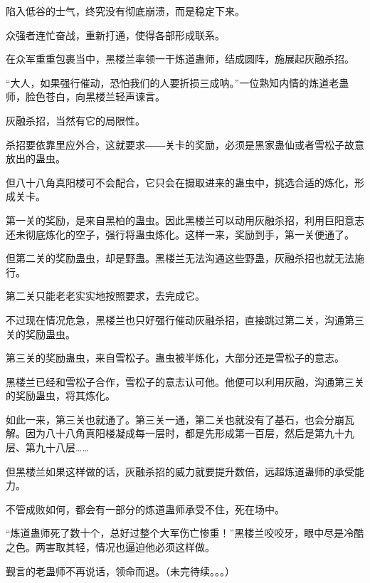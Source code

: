\begin{this_body}
陷入低谷的士气，终究没有彻底崩溃，而是稳定下来。

众强者连忙奋战，重新打通，使得各部形成联系。

在众军重重包裹当中，黑楼兰率领一干炼道蛊师，结成圆阵，施展起灰融杀招。

“大人，如果强行催动，恐怕我们的人要折损三成呐。”一位熟知内情的炼道老蛊师，脸色苍白，向黑楼兰轻声谏言。

灰融杀招，当然有它的局限性。

杀招要依靠里应外合，这就要求――关卡的奖励，必须是黑家蛊仙或者雪松子故意放出的蛊虫。

但八十八角真阳楼可不会配合，它只会在摄取进来的蛊虫中，挑选合适的炼化，形成关卡。

第一关的奖励，是来自黑柏的蛊虫。因此黑楼兰可以动用灰融杀招，利用巨阳意志还未彻底炼化的空子，强行将蛊虫炼化。这样一来，奖励到手，第一关便通了。

但第二关的奖励蛊虫，却是野蛊。黑楼兰无法沟通这些野蛊，灰融杀招也就无法施行。

第二关只能老老实实地按照要求，去完成它。

不过现在情况危急，黑楼兰也只好强行催动灰融杀招，直接跳过第二关，沟通第三关的奖励蛊虫。

第三关的奖励蛊虫，来自雪松子。蛊虫被半炼化，大部分还是雪松子的意志。

黑楼兰已经和雪松子合作，雪松子的意志认可他。他便可以利用灰融，沟通第三关的奖励蛊虫，将其炼化。

如此一来，第三关也就通了。第三关一通，第二关也就没有了基石，也会分崩瓦解。因为八十八角真阳楼凝成每一层时，都是先形成第一百层，然后是第九十九层、第九十八层……

但黑楼兰如果这样做的话，灰融杀招的威力就要提升数倍，远超炼道蛊师的承受能力。

不管成败如何，都会有一部分的炼道蛊师承受不住，死在场中。

“炼道蛊师死了数十个，总好过整个大军伤亡惨重！”黑楼兰咬咬牙，眼中尽是冷酷之色。两害取其轻，情况也逼迫他必须这样做。

觐言的老蛊师不再说话，领命而退。（未完待续。。。）

\end{this_body}

